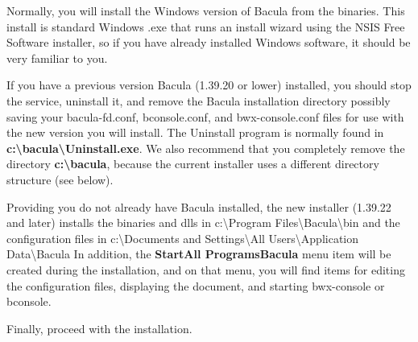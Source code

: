 Normally, you will install the Windows version of Bacula from the binaries.
This install is standard Windows .exe that runs an install wizard using the
NSIS Free Software installer, so if you have already installed Windows
software, it should be very familiar to you. 

If you have a previous version Bacula (1.39.20 or lower)
installed, you should stop the service, uninstall it, and remove
the Bacula installation directory possibly saving your
bacula-fd.conf, bconsole.conf, and bwx-console.conf files
for use with the new version you will install.  The Uninstall
program is normally found in {\bf c:\textbackslash{}bacula\textbackslash{}Uninstall.exe}.
We also recommend that you completely remove the directory
{\bf c:\textbackslash{}bacula}, because the current installer
uses a different directory structure (see below).

Providing you do not already have Bacula installed,
the new installer (1.39.22 and later) installs the binaries and dlls in 
c:\textbackslash{}Program Files\textbackslash{}Bacula\textbackslash{}bin  
and the configuration files
in c:\textbackslash{}Documents and Settings\textbackslash{}All Users\textbackslash{}Application Data\textbackslash{}Bacula
In addition, the {\bf Start\-\gt{}All Programs\-\gt{}Bacula} menu item
will be created during the installation, and on that menu, you
will find items for editing the configuration files, displaying
the document, and starting bwx-console or bconsole.


Finally, proceed with the installation. 

